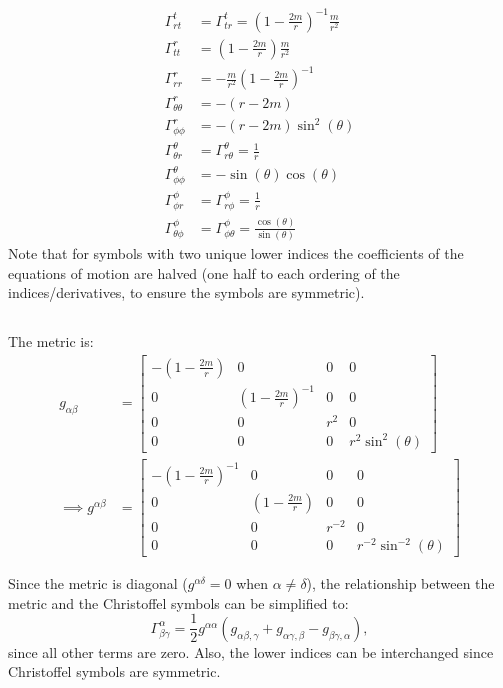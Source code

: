 \documentclass[a4paper]{article}
\begin{document}
\begin{align*}
	\Gamma^t_{r t} &=  \Gamma^t_{t r} = \left(1-\frac{2m}{r}\right)^{-1} \frac{m}{r^2}\\
	\Gamma^r_{tt} &=  \left( 1 - \frac{2m}{r} \right) \frac{m}{r^2}\\
\Gamma^r_{rr} &=   -\frac{m}{r^2} \left(1-\frac{2m}{r}\right)^{-1} \\
\Gamma^r_{\theta \theta} &=  -\left( r - 2m \right) \\
\Gamma^r_{\phi \phi} &=  -\left( r - 2m \right) \sin^2(\theta)\\
\Gamma^\theta _{\theta r} &= \Gamma^\theta _{r \theta} = \frac{1}{r}\\
\Gamma^\theta _{\phi \phi} &=  -\sin(\theta) \cos(\theta)\\
\Gamma^\phi_{\phi r} &= \Gamma^\phi_{r \phi} =  \frac{1}{r}\\
\Gamma^\phi_{\theta \phi} &= \Gamma^\phi_{\phi \theta} = \frac{ \cos(\theta)}{\sin(\theta)}
\end{align*}
Note that for symbols with two unique lower indices the coefficients of the equations of motion are halved (one half to each ordering of the indices/derivatives, to ensure the symbols are symmetric).

\subsection{}

The metric is:
\begin{align*}
	g_{\alpha\beta} &= \begin{bmatrix} -\left(1-\frac{2m}{r}\right) & 0 & 0 & 0 \\
		0 & \left( 1 - \frac{2m}{r} \right)^{-1} & 0 & 0\\
		0 & 0 & r^2 & 0 \\
		0 & 0 & 0 & r^2 \sin^2(\theta)
	\end{bmatrix}\\
	\implies g^{\alpha\beta} &= \begin{bmatrix} -\left(1-\frac{2m}{r}\right)^{-1} & 0 & 0 & 0 \\
		0 & \left( 1 - \frac{2m}{r} \right) & 0 & 0\\
		0 & 0 & r^{-2} & 0 \\
		0 & 0 & 0 & r^{-2} \sin^{-2}(\theta)
	\end{bmatrix}
\end{align*}

Since the metric is diagonal ($g^{\alpha \delta} = 0$ when $\alpha \ne \delta$), the relationship between the metric and the Christoffel symbols can be simplified to:
$$\Gamma^\alpha_{\beta \gamma} = \frac{1}{2} g^{\alpha \alpha}(g_{\alpha \beta , \gamma} + g_{\alpha \gamma , \beta} - g_{\beta \gamma , \alpha}), $$
since all other terms are zero. 
Also, the lower indices can be interchanged since Christoffel symbols are symmetric.
\end{document}
